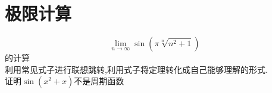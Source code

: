 \documentclass{article}
\begin{document}
\section{极限计算}
\[\lim_{n\to \infty}\sin(\pi\sqrt[n]{n^2+1})\]的计算\\
利用常见式子进行联想跳转,利用式子将定理转化成自己能够理解的形式.\\
证明$\sin(x^2+x)$不是周期函数\\
\end{document}
